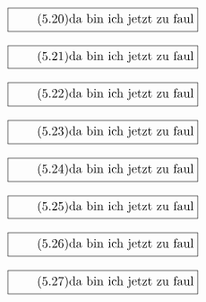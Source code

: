 \documentclass[11pt]{article}
\newcommand{\1}{ {\mathds{1}} }
\begin{document}
    \begin{equation}
      \boxed{
        \tag{5.20}
        \begin{split}
          \text{da bin ich jetzt zu faul}
        \end{split}
      }
    \end{equation}

    \begin{equation}
      \boxed{
        \tag{5.21}
        \begin{split}
          \text{da bin ich jetzt zu faul}
        \end{split}
      }
    \end{equation}

    \begin{equation}
      \boxed{
        \tag{5.22}
        \begin{split}
          \text{da bin ich jetzt zu faul}
        \end{split}
      }
    \end{equation}

    \begin{equation}
      \boxed{
        \tag{5.23}
        \begin{split}
          \text{da bin ich jetzt zu faul}
        \end{split}
      }
    \end{equation}

    \begin{equation}
      \boxed{
        \tag{5.24}
        \begin{split}
          \text{da bin ich jetzt zu faul}
        \end{split}
      }
    \end{equation}

    \begin{equation}
      \boxed{
        \tag{5.25}
        \begin{split}
          \text{da bin ich jetzt zu faul}
        \end{split}
      }
    \end{equation}

    \begin{equation}
      \boxed{
        \tag{5.26}
        \begin{split}
          \text{da bin ich jetzt zu faul}
        \end{split}
      }
    \end{equation}

    \begin{equation}
      \boxed{
        \tag{5.27}
        \begin{split}
          \text{da bin ich jetzt zu faul}
        \end{split}
      }
    \end{equation}
    
\end{document}
